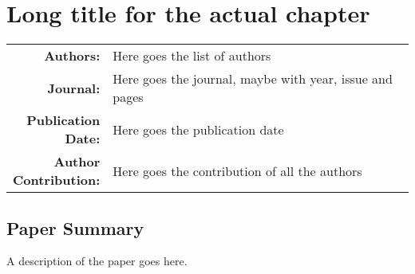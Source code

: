 \documentclass[../main.tex]{subfiles}
\begin{document}
\chapter[Short title for table of contents]{Long title for the actual chapter}
\label{cha:label} %

{\renewcommand{\arraystretch}{2.0} %
	\begin{table}[h]
		\begin{tabularx}{\textwidth}{>{\bfseries}r X}

			Authors: & Here goes the list of authors \\
			Journal: & Here goes the journal, maybe with year, issue and pages \\
			\makecell[tr]{Publication \\ Date:} & Here goes the publication date \\
			\makecell[tr]{Author \\ Contribution:} & Here goes the contribution of all the authors \\

		\end{tabularx}
	\end{table}
}

\clearpage

\section*{Paper Summary}

A description of the paper goes here.

\clearpage %
\end{document}
